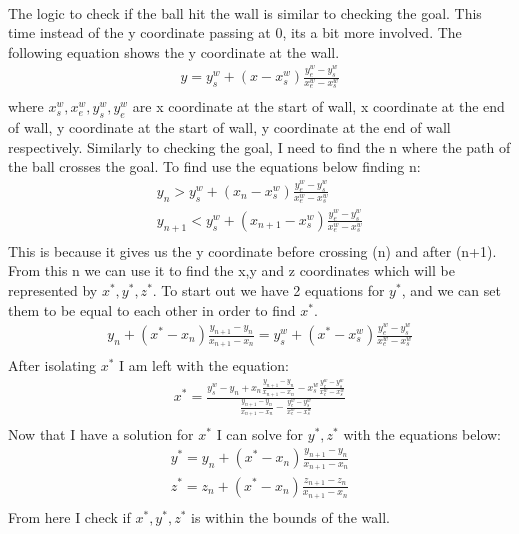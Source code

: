 \documentclass[12pt]{article}
\begin{document}
\\
The logic to check if the ball hit the wall is similar to checking the goal.  This time instead of the y coordinate passing at 0, its a bit more involved.  The following equation shows the y coordinate at the wall.
\begin{eqnarray}
y = y_s^w + (x - x_s^w)\frac{y_e^w-y_s^w}{x_e^w-x_s^w}\\\nonumber
\end{eqnarray}
where $x_s^w, x_e^w, y_s^w, y_e^w$ are x coordinate at the start of wall, x coordinate at the end of wall, y coordinate at the start of wall, y coordinate at the end of wall respectively.  Similarly  to checking the goal, I need to find the n where the path of the ball crosses the goal.  To find use the equations below finding n:
\begin{eqnarray}
y_{n} > y_s^w + (x_n - x_s^w)\frac{y_e^w-y_s^w}{x_e^w-x_s^w}\\\nonumber
y_{n+1} < y_s^w + (x_{n+1} - x_s^w)\frac{y_e^w-y_s^w}{x_e^w-x_s^w}\\\nonumber
\end{eqnarray}
This is because it gives us the y coordinate before crossing (n) and after (n+1).\\
From this n we can use it to find the x,y and z coordinates which will be represented by $x^*,y^*,z^*$.  To start out we have 2 equations for $y^*$, and we can set them to be equal to each other in order to find $x^*$.
\begin{eqnarray}
 y_n + (x^* - x_n)\frac{y_{n+1}-y_n}{x_{n+1}-x_n}=y_s^w + (x^* - x_s^w)\frac{y_e^w-y_s^w}{x_e^w-x_s^w}\\\nonumber
\end{eqnarray}
After isolating $x^*$ I am left with the equation:
\begin{eqnarray}
x^* = \frac{y_s^w - y_n + x_n\frac{y_{n+1}-y_n}{x_{n+1}-x_n}- x_s^w\frac{y_e^w-y_s^w}{x_e^w-x_s^w}}{\frac{y_{n+1}-y_n}{x_{n+1}-x_n}-\frac{y_e^w-y_s^w}{x_e^w-x_s^w}}\\\nonumber
\end{eqnarray}
Now that I have a solution for $x^*$ I can solve for $y^*,z^*$ with the equations below:
\begin{eqnarray}
y^* =  y_n + (x^* - x_n)\frac{y_{n+1}-y_n}{x_{n+1}-x_n} \\\nonumber
z^* =  z_n + (x^* - x_n)\frac{z_{n+1}-z_n}{x_{n+1}-x_n} \\\nonumber
\end{eqnarray}
From here I check if $x^*,y^*,z^*$ is within the bounds of the wall.
\end{document}
